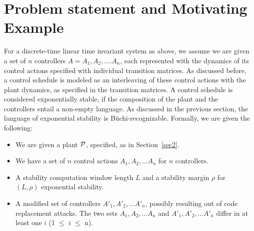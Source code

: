 \section{Problem statement and Motivating Example} \label{sec3}
\noindent
% 
For a discrete-time  linear time invariant system as above, we assume we are given 
a set of $n$ controllers $ A = { {A_1}, {A_2}, ....{A_n}} $, each represented 
with the dynamics of its control actions specified with individual transition matrices. As discussed before,  
a control schedule is modeled as an interleaving of these control actions with the plant dynamics, as specified 
in the transition matrices. A control schedule is considered exponentially stable, if the composition of the plant and the controllers entail a non-empty language. 
As discussed in the previous section, the language of exponential stability is 
B\"{u}chi-recognizable. Formally, we are given the following:

\begin{itemize}
 \item We are given a plant ${\cal P}$, specified, as in Section~\ref{sec2}.
 \item We have  a set of $n$ control actions $A_1, A_2, \ldots A_n$ for $n$ controllers.
 \item A stability computation window length $L$ and a stability margin 
$\rho$ for $(L, \rho)$ exponential stability.
 \item A modified set of controllers $A'_1, A'_2, \ldots A'_n$, possibly resulting out of code replacement attacks. The two sets $A_1, A_2, \ldots A_n$ 
       and $A'_1, A'_2, \ldots A'_n$ differ in at least one $i$ (1 $\leq$ $i$ $\leq$ n).
\end{itemize}

